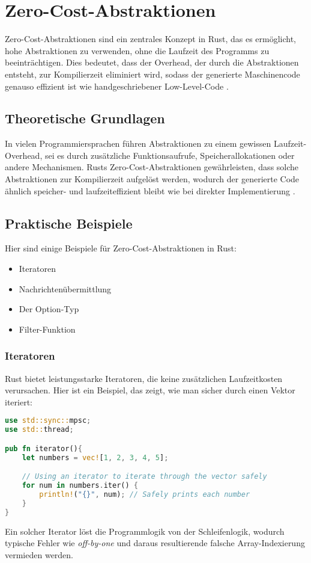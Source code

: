 \chapter{Zero-Cost-Abstraktionen}

Zero-Cost-Abstraktionen sind ein zentrales Konzept in Rust, das es ermöglicht, hohe Abstraktionen zu verwenden, ohne die Laufzeit des Programms zu beeinträchtigen. 
Dies bedeutet, dass der Overhead, der durch die Abstraktionen entsteht, zur Kompilierzeit eliminiert wird, sodass der generierte Maschinencode genauso effizient ist wie handgeschriebener Low-Level-Code \cite{sequeira2023}.

\section{Theoretische Grundlagen}

In vielen Programmiersprachen führen Abstraktionen zu einem gewissen Laufzeit-Overhead, sei es durch zusätzliche Funktionsaufrufe, Speicherallokationen oder andere Mechanismen.
Rusts Zero-Cost-Abstraktionen gewährleisten, dass solche Abstraktionen zur Kompilierzeit aufgelöst werden, wodurch der generierte Code ähnlich speicher- und laufzeiteffizient bleibt wie bei direkter Implementierung \cite{haberman2014}.

\section{Praktische Beispiele}

Hier sind einige Beispiele für Zero-Cost-Abstraktionen in Rust:

\begin{itemize}
    \item Iteratoren
    \item Nachrichtenübermittlung
    \item Der Option-Typ
    \item Filter-Funktion
\end{itemize}

\subsection{Iteratoren}

Rust bietet leistungsstarke Iteratoren, die keine zusätzlichen Laufzeitkosten verursachen. 
Hier ist ein Beispiel, das zeigt, wie man sicher durch einen Vektor iteriert:

\begin{lstlisting}[language=Rust, caption=Iterator]
use std::sync::mpsc;
use std::thread;

pub fn iterator(){
    let numbers = vec![1, 2, 3, 4, 5];

    // Using an iterator to iterate through the vector safely
    for num in numbers.iter() {
        println!("{}", num); // Safely prints each number
    }
}
\end{lstlisting}
Ein solcher Iterator löst die Programmlogik von der Schleifenlogik, wodurch typische Fehler wie \textit{\gls{off-by-one}} und daraus resultierende falsche Array-Indexierung vermieden werden.
\cleardoublepage
